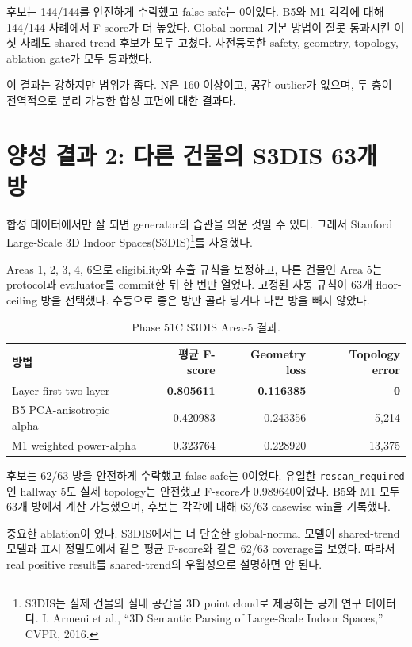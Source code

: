 \documentclass[11pt,a4paper]{article}
\newcommand{\code}[1]{\texttt{#1}}
\begin{document}
후보는 144/144를 안전하게 수락했고 false-safe는 0이었다. B5와 M1 각각에
대해 144/144 사례에서 F-score가 더 높았다. Global-normal 기본 방법이 잘못
통과시킨 여섯 사례도 shared-trend 후보가 모두 고쳤다. 사전등록한 safety,
geometry, topology, ablation gate가 모두 통과했다.

이 결과는 강하지만 범위가 좁다. N은 160 이상이고, 공간 outlier가 없으며,
두 층이 전역적으로 분리 가능한 합성 표면에 대한 결과다.

\section{양성 결과 2: 다른 건물의 S3DIS 63개 방}

합성 데이터에서만 잘 되면 generator의 습관을 외운 것일 수 있다. 그래서
Stanford Large-Scale 3D Indoor Spaces(S3DIS)\footnote{S3DIS는 실제 건물의
실내 공간을 3D point cloud로 제공하는 공개 연구 데이터다. I. Armeni et al.,
``3D Semantic Parsing of Large-Scale Indoor Spaces,'' CVPR, 2016.}를 사용했다.

Areas 1, 2, 3, 4, 6으로 eligibility와 추출 규칙을 보정하고, 다른 건물인
Area 5는 protocol과 evaluator를 commit한 뒤 한 번만 열었다. 고정된 자동 규칙이
63개 floor-ceiling 방을 선택했다. 수동으로 좋은 방만 골라 넣거나 나쁜 방을
빼지 않았다.

\begin{table}[tbp]
\centering
\caption{Phase 51C S3DIS Area-5 결과.}
\small
\begin{tabularx}{\textwidth}{Xrrr}
\toprule
방법 & 평균 F-score & Geometry loss & Topology error \\
\midrule
Layer-first two-layer & \textbf{0.805611} & \textbf{0.116385} & \textbf{0} \\
B5 PCA-anisotropic alpha & 0.420983 & 0.243356 & 5,214 \\
M1 weighted power-alpha & 0.323764 & 0.228920 & 13,375 \\
\bottomrule
\end{tabularx}
\end{table}

후보는 62/63 방을 안전하게 수락했고 false-safe는 0이었다. 유일한
\code{rescan\_required}인 hallway 5도 실제 topology는 안전했고 F-score가
0.989640이었다. B5와 M1 모두 63개 방에서 계산 가능했으며, 후보는 각각에 대해
63/63 casewise win을 기록했다.

중요한 ablation이 있다. S3DIS에서는 더 단순한 global-normal 모델이
shared-trend 모델과 표시 정밀도에서 같은 평균 F-score와 같은 62/63 coverage를
보였다. 따라서 real positive result를 shared-trend의 우월성으로 설명하면 안 된다.
\end{document}
